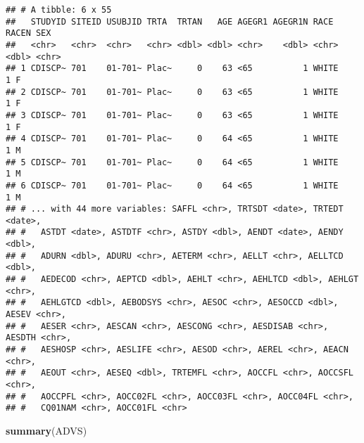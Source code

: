 \documentclass[]{book}
\newenvironment{Shaded}{\begin{snugshade}}{\end{snugshade}}
\newcommand{\KeywordTok}[1]{\textcolor[rgb]{0.13,0.29,0.53}{\textbf{#1}}}
\newcommand{\NormalTok}[1]{#1}
\begin{document}
\begin{verbatim}
## # A tibble: 6 x 55
##   STUDYID SITEID USUBJID TRTA  TRTAN   AGE AGEGR1 AGEGR1N RACE  RACEN SEX  
##   <chr>   <chr>  <chr>   <chr> <dbl> <dbl> <chr>    <dbl> <chr> <dbl> <chr>
## 1 CDISCP~ 701    01-701~ Plac~     0    63 <65          1 WHITE     1 F    
## 2 CDISCP~ 701    01-701~ Plac~     0    63 <65          1 WHITE     1 F    
## 3 CDISCP~ 701    01-701~ Plac~     0    63 <65          1 WHITE     1 F    
## 4 CDISCP~ 701    01-701~ Plac~     0    64 <65          1 WHITE     1 M    
## 5 CDISCP~ 701    01-701~ Plac~     0    64 <65          1 WHITE     1 M    
## 6 CDISCP~ 701    01-701~ Plac~     0    64 <65          1 WHITE     1 M    
## # ... with 44 more variables: SAFFL <chr>, TRTSDT <date>, TRTEDT <date>,
## #   ASTDT <date>, ASTDTF <chr>, ASTDY <dbl>, AENDT <date>, AENDY <dbl>,
## #   ADURN <dbl>, ADURU <chr>, AETERM <chr>, AELLT <chr>, AELLTCD <dbl>,
## #   AEDECOD <chr>, AEPTCD <dbl>, AEHLT <chr>, AEHLTCD <dbl>, AEHLGT <chr>,
## #   AEHLGTCD <dbl>, AEBODSYS <chr>, AESOC <chr>, AESOCCD <dbl>, AESEV <chr>,
## #   AESER <chr>, AESCAN <chr>, AESCONG <chr>, AESDISAB <chr>, AESDTH <chr>,
## #   AESHOSP <chr>, AESLIFE <chr>, AESOD <chr>, AEREL <chr>, AEACN <chr>,
## #   AEOUT <chr>, AESEQ <dbl>, TRTEMFL <chr>, AOCCFL <chr>, AOCCSFL <chr>,
## #   AOCCPFL <chr>, AOCC02FL <chr>, AOCC03FL <chr>, AOCC04FL <chr>,
## #   CQ01NAM <chr>, AOCC01FL <chr>
\end{verbatim}

\begin{Shaded}
\begin{Highlighting}[]
\KeywordTok{summary}\NormalTok{(ADVS)}
\end{Highlighting}
\end{Shaded}
\end{document}
